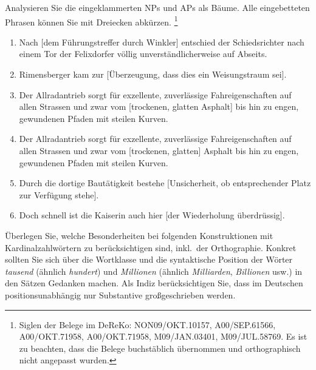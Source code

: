 \begin{sloppypar}

 \label{exc:phrasen01} Analysieren Sie die eingeklammerten NPs und APs als Bäume.
Alle eingebetteten Phrasen können Sie mit Dreiecken abkürzen.%
\footnote{Siglen der Belege im DeReKo: NON09\slash OKT.10157, A00\slash SEP.61566, A00\slash OKT.71958, A00\slash OKT.71958, M09\slash JAN.03401, M09\slash JUL.58769.
Es ist zu beachten, dass die Belege buchstäblich übernommen und orthographisch nicht angepasst wurden.}

\begin{enumerate}
  \item Nach [dem Führungstreffer durch Winkler] entschied der Schiedsrichter nach einem Tor der Felixdorfer völlig unverständlicherweise auf Abseits.
  \item Rimensberger kam zur [Überzeugung, dass dies ein Weisungstraum sei].
  \item Der Allradantrieb sorgt für exzellente, zuverlässige Fahreigenschaften auf allen Strassen und zwar vom [trockenen, glatten Asphalt] bis hin zu engen, gewundenen Pfaden mit steilen Kurven.
  \item Der Allradantrieb sorgt für exzellente, zuverlässige Fahreigenschaften auf allen Strassen und zwar vom [trockenen, glatten] Asphalt bis hin zu engen, gewundenen Pfaden mit steilen Kurven.
  \item Durch die dortige Bautätigkeit bestehe [Unsicherheit, ob entsprechender Platz zur Verfügung stehe].
  \item Doch schnell ist die Kaiserin auch hier [der Wiederholung überdrüssig].
\end{enumerate}

\Uebung[\tristar]{} \label{exc:phrasen50} Überlegen Sie, welche Besonderheiten bei folgenden Konstruktionen mit Kardinalzahlwörtern zu berücksichtigen sind, inkl.\ der Orthographie.
Konkret sollten Sie sich über die Wortklasse und die syntaktische Position der Wörter \textit{tausend} (ähnlich \textit{hundert}) und \textit{Millionen} (ähnlich \textit{Milliarden}, \textit{Billionen} usw.) in den Sätzen Gedanken machen.
Als Indiz berücksichtigen Sie, dass im Deutschen positionsunabhängig nur Substantive großgeschrieben werden.

\begin{exe}
  \ex
  \begin{xlist}
  \end{xlist}
  \ex
  \begin{xlist}
  \end{xlist}
\end{exe}


\end{sloppypar}
